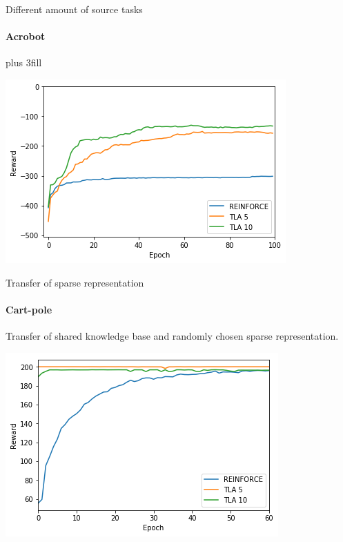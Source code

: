 \begin{frame}[fragile]{Different amount of source tasks}
\framesubtitle{Acrobot}
\vskip0pt plus 3fill
\begin{center}
    \includegraphics[width=.8\linewidth]{results/Acrobot/no_sparse_transfer/reward_target_re-akt5-akt10.png}
\end{center}
\end{frame}

\begin{frame}[fragile]{Transfer of sparse representation}
\framesubtitle{Cart-pole}
Transfer of shared knowledge base and randomly chosen sparse representation.
\begin{center}
    \includegraphics[width=.8\linewidth]{results/CartPole/sparse_transfer/reward_target_re-akt5-akt10.png}
\end{center}
\end{frame}

